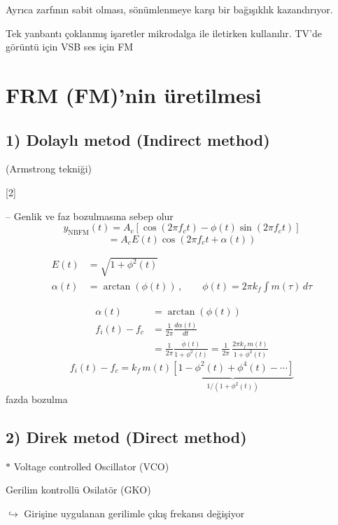 \documentclass[11pt,a4paper]{article}
\begin{document}
Ayrıca zarfının sabit olması, sönümlenmeye karşı  bir bağışıklık kazandırıyor.

Tek yanbantı çoklanmış işaretler mikrodalga ile iletirken kullanılır. TV'de görüntü için VSB ses için FM

\section{FRM (FM)'nin üretilmesi}
\subsection{1) Dolaylı metod (Indirect method)}
(Armstrong tekniği)

[2]

-- Genlik ve faz bozulmasına sebep olur
\[ y_{\mathrm{NBFM}}(t) = A_c\left[\cos(2\pi f_c t)-\phi(t)\sin(2\pi f_c t)\right] \]
\[ = A_c E(t)\cos\left(2\pi f_c t+\alpha(t)\right) \]

\begin{align*}
E(t) &= \sqrt{1+\phi^2(t)} \\
\alpha(t) &= \arctan(\phi(t)) \, , \qquad \phi(t) = 2\pi k_f\int m(\tau)\,d\tau
\end{align*}

\begin{align*}
\alpha(t) &= \arctan(\phi(t)) \\
f_i(t)-f_c &= \frac{1}{2\pi}\frac{d\alpha(t)}{dt} \\
&= \frac{1}{2\pi}\frac{\dot\phi(t)}{1+\phi^2(t)} = \frac{1}{2\pi}\,\frac{2\pi k_f\, m(t)}{1+\phi^2(t)}
\end{align*}
\[ f_i(t)-f_c = k_f\,m(t)\underbrace{\left[1-\phi^2(t)+\phi^4(t)-\cdots\right]}_{1/(1+\phi^2(t))} \]
fazda bozulma

\subsection{2) Direk metod (Direct method)}
$\ast$ Voltage controlled Oscillator (VCO)

Gerilim kontrollü Osilatör (GKO)

$\hookrightarrow$ Girişine uygulanan gerilimle çıkış frekansı değişiyor
\end{document}

